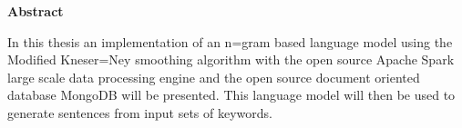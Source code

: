 \thispagestyle{empty}
\begin{center}
    
    \vspace{0.9cm}
    \large{}
    \textbf{Abstract}

\end{center}
\begin{center}
\vspace{0.3cm}
\large{}
\vspace{0.4cm}
     
In this thesis an implementation of an n=gram based language model using the Modified Kneser=Ney smoothing algorithm with the open source Apache Spark large scale data processing engine and the open source document oriented database MongoDB will be presented. This language model will then be used to generate sentences from input sets of keywords.
     

\end{center}